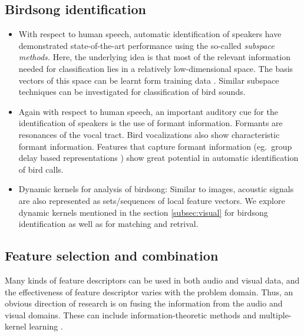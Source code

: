\documentclass{article}
\begin{document}
\subsection{Birdsong identification}

\begin{itemize}
\item With respect to human speech, automatic identification of speakers have
demonstrated state-of-the-art performance using the so-called \emph{subspace
methods.} Here, the underlying idea is that most of the relevant information
needed for classification 
lies in a relatively low-dimensional space. The basis vectors of this space can
be learnt form training data \cite{dehak_ivector}. Similar subspace techniques
can be investigated for classification of bird sounds.
\item Again with respect to human speech, an important auditory cue for the
identification of speakers is the use of formant information. Formants are
resonances of the vocal tract. Bird vocalizations also show characteristic
formant information. Features that capture formant information (eg.~group delay
based representations \cite{padmanAllPoleGDelay, hegdeModgdf}) show great potential in
automatic identification of bird calls.

\item Dynamic kernels for analysis of birdsong: Similar to images, acoustic
signals are also represented as sets/sequences of local feature vectors. We
explore dynamic kernels mentioned in the section \ref{subsec:visual} for
birdsong identification as well as for matching and retrival.  

\end{itemize}





\subsection{Feature selection and combination}

Many kinds of feature descriptors can be used in both audio and visual data, and
the effectiveness of feature descriptor varies with the problem domain. Thus, an
obvious direction of research is on fusing the information from the audio and visual domains.
These can include information-theoretic methods and multiple-kernel learning
\cite{LargeScaleMKL,mkl2}.

\end{document}
